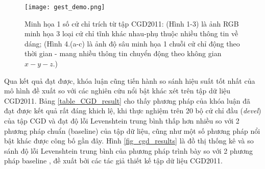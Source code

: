 \begin{figure}
\centering
\texttt{[image: gest\_demo.png]}
\caption{Minh họa 1 số cử chỉ trích từ tập CGD2011: (Hình 1-3) là ảnh RGB minh họa 3 loại cử chỉ tĩnh khác nhau-phụ thuộc nhiều thông tin về dáng; (Hình 4.(a-c) là ảnh độ sâu minh họa 1 chuỗi cử chỉ động theo thời gian - mang nhiều thông tin chuyển động theo không gian $x-y-z$.)}
\label{fig_gest_demo}
\end{figure}
Qua kết quả đạt được, khóa luận cũng tiến hành so sánh hiệu suất tốt nhất của mô hình đề xuất so với các nghiên cứu nổi bật khác xét trên tập dữ liệu CGD2011. Bảng \ref{table_CGD_result} cho thấy phương pháp của khóa luận đã đạt được kết quả rất đáng khich lệ, khi thực nghiệm trên 20 bộ cử chỉ đầu (\textit{devel}) của tập CGD và đạt độ lỗi Levenshtein trung bình thấp hơn nhiều so với 2 phương pháp chuẩn (baseline) của tập dữ liệu, cũng như một số phương pháp nổi bật khác được công bố gần đây. Hình \ref{fig_cgd_results} là đồ thị thống kê và so sánh độ lỗi Levenshtein trung bình của phương pháp trình bày so với 2 phương pháp baseline \cite{Isabelle_Chalearn}, \cite{Isabelle_Baseline} đề xuất bởi các tác giả thiết kế tập dữ liệu CGD2011. 

\begin{table}
	\caption{Đánh giá hiệu suất khi sử dụng riêng lẻ và kết hợp từng loại đặc trưng trên các kênh dữ liệu màu-độ sâu)}
	\centering 
	\label{table_CGD_result}
\end{table}

\begin{table}
	\caption{So sánh độ chính xác với một số nghiên cứu nổi bật khác, xét trên 20 batch "devel" của tập CGD2011, sử dụng độ đo Levenshtein.}
	\centering 
	\label{table_CGD_comparison}
\end{table}

